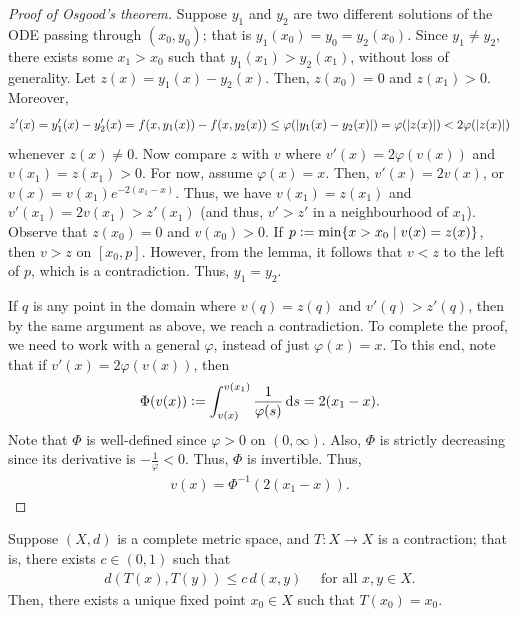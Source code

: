 \begin{proof}[Proof of Osgood's theorem]
    Suppose $y_{1}$ and $y_{2}$ are two different solutions of the ODE passing through $(x_{0},y_{0})$; that is $y_{1}(x_{0}) = y_{0} = y_{2}(x_{0})$. Since $y_{1} \neq y_{2}$, there exists some $x_{1} > x_{0}$ such that $y_{1}(x_{1}) > y_{2}(x_{1})$, without loss of generality. Let $z(x) = y_{1}(x) - y_{2}(x)$. Then, $z(x_{0}) = 0$ and $z(x_{1}) > 0$. Moreover,
    \begin{align}
        z'(x) = y_{1}'(x) - y_{2}'(x) = f(x,y_{1}(x)) - f(x,y_{2}(x)) \leq \varphi(\left| y_{1}(x)-y_{2}(x) \right|) = \varphi(\left| z(x) \right|) < 2\varphi(\left| z(x) \right|)
    \end{align}
    whenever $z(x) \neq 0$. Now compare $z$ with $v$ where $v'(x) = 2 \varphi(v(x))$ and $v(x_{1}) = z(x_{1}) > 0$. For now, assume $\varphi(x) = x$. Then, $v'(x) = 2 v(x)$, or $v(x) = v(x_{1})e^{-2(x_{1}-x)}$. Thus, we have $v(x_{1}) = z(x_{1})$ and $v'(x_{1}) = 2 v(x_{1}) > z'(x_{1})$ (and thus, $v' > z'$ in a neighbourhood of $x_{1}$). Observe that $z(x_{0}) = 0$ and $v(x_{0}) > 0$. If $p \vcentcolon= \min \{x > x_{0} \mid v(x) = z(x)\}$, then $v > z$ on $[x_{0},p]$. However, from the lemma, it follows that $v < z$ to the left of $p$, which is a contradiction. Thus, $y_{1} = y_{2}$.

    If $q$ is any point in the domain where $v(q) = z(q)$ and $v'(q) > z'(q)$, then by the same argument as above, we reach a contradiction. To complete the proof, we need to work with a general $\varphi$, instead of just $\varphi(x) = x$. To this end, note that if $v'(x) = 2 \varphi(v(x))$, then
    \begin{align}
        \Phi(v(x)) \vcentcolon= \int_{v(x)}^{v(x_{1})} \frac{1}{\varphi(s)} \, \mathrm{d}s = 2 (x_{1} - x).
    \end{align}
    Note that $\Phi$ is well-defined since $\varphi > 0$ on $(0,\infty)$. Also, $\Phi$ is strictly decreasing since its derivative is $-\frac{1}{\varphi} < 0$. Thus, $\Phi$ is invertible. Thus,
    \begin{align}
        v(x) = \Phi^{-1}(2 (x_{1} - x)).
    \end{align}
\end{proof}

\begin{theorem}
    Suppose $(X,d)$ is a complete metric space, and $T:X \to X$ is a contraction; that is, there exists $ c \in (0,1)$ such that
    \begin{align}
        d(T(x),T(y)) \leq c \, d(x,y) \quad \text{ for all } x,y \in X.
    \end{align}
    Then, there exists a unique fixed point $x_{0} \in X$ such that $T(x_{0}) = x_{0}$.
\end{theorem}


